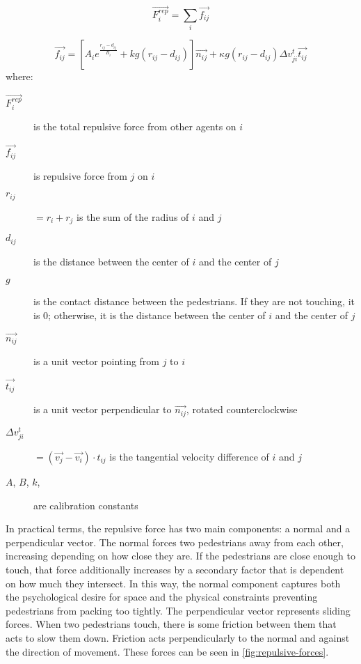 \documentclass[twoside, 11pt]{article}
\begin{document}
\begin{equation}
  \vec{F_i^{rep}} = \sum_i\vec{f_{ij}}
  \label{eq:pedestrian_repulsion_total}
\end{equation}

\begin{equation}
  \vec{f_{ij}} = [A_ie^{\frac{r_{ij} - d_{ij}}{B_i}} + kg(r_{ij}-d_{ij})]\vec{n_{ij}} + \kappa g (r_{ij} - d_{ij})\Delta v_{ji}^t \vec{t_{ij}}
  \label{eq:pedestrian_repulsion}
\end{equation}
where:
\begin{description}
  \item[$\vec{F_i^{rep}}$] is the total repulsive force from other agents on $i$
  \item[$\vec{f_{ij}}$] is repulsive force from $j$ on $i$
  
  \item[$r_{ij}$] $= r_i + r_j$ is the sum of the radius of $i$ and $j$
  \item[$d_{ij}$] is the distance between the center of $i$ and the center of $j$
  \item[$g$] is the contact distance between the pedestrians. If they are not touching, it is $0$; otherwise, it is the distance between the center of $i$ and the center of $j$
  \item[$\vec{n_{ij}}$] is a unit vector pointing from $j$ to $i$
  \item[$\vec{t_{ij}}$] is a unit vector perpendicular to $\vec{n_{ij}}$, rotated counterclockwise
  \item[$\Delta v_{ji}^t$] $= (\vec{v_j} - \vec{v_i}) \cdot t_{ij}$ is the tangential velocity difference of $i$ and $j$
  \item[$A$, $B$, $k$, \kappa] are calibration constants
\end{description}

In practical terms, the repulsive force has two main components: a normal and a perpendicular vector. The normal forces two pedestrians away from each other, increasing depending on how close they are. If the pedestrians are close enough to touch, that force additionally increases by a secondary factor that is dependent on how much they intersect. In this way, the normal component captures both the psychological desire for space and the physical constraints preventing pedestrians from packing too tightly. The perpendicular vector represents sliding forces. When two pedestrians touch, there is some friction between them that acts to slow them down. Friction acts perpendicularly to the normal and against the direction of movement. These forces can be seen in \autoref{fig:repulsive-forces}.
\end{document}
